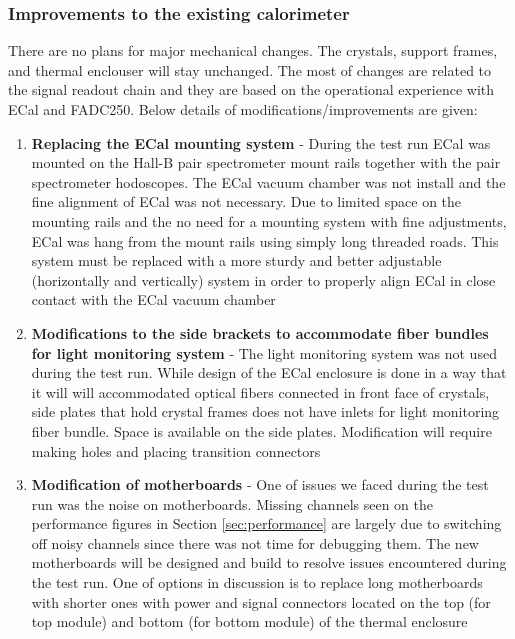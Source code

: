 \subsubsection{Improvements to the existing calorimeter}

There are no plans for major mechanical changes. The crystals, support frames, and thermal enclouser will stay unchanged. The most of changes are related to the signal readout chain and they are based on the operational experience with ECal and FADC250. Below details of modifications/improvements are given: 

\begin{enumerate}
\item {\bf Replacing the ECal mounting system} - 
During the test run ECal was mounted on the Hall-B pair spectrometer mount rails together with the pair spectrometer hodoscopes. The ECal vacuum chamber was not install and the fine alignment of ECal was not necessary. Due to limited space on the mounting rails and the no need for a mounting system with fine adjustments, ECal was hang from the mount rails using simply long threaded roads. This system must be replaced with a more sturdy and better adjustable (horizontally and vertically) system in order to properly align ECal in close contact with the ECal vacuum chamber

\item {\bf Modifications to the side brackets to accommodate fiber bundles for light monitoring system} -
The light monitoring system was not used during the test run. While design of the ECal enclosure is done in a way that it will will accommodated optical fibers connected in front face of crystals, side plates that hold crystal frames does not have inlets for light monitoring fiber bundle. Space is available on the side plates. Modification will require making holes and placing transition connectors  
    
\item {\bf Modification of motherboards} - One of issues we faced during the test run was the noise on motherboards. Missing channels seen on the performance figures in Section \ref{sec:performance} are largely due to switching off noisy channels since there was not time for debugging them. The new motherboards will be designed and build to resolve issues encountered during the test run. One of options in discussion is to replace long motherboards with shorter ones with power and signal connectors located on the top (for top module) and bottom (for bottom module) of the thermal enclosure


\end{enumerate}
